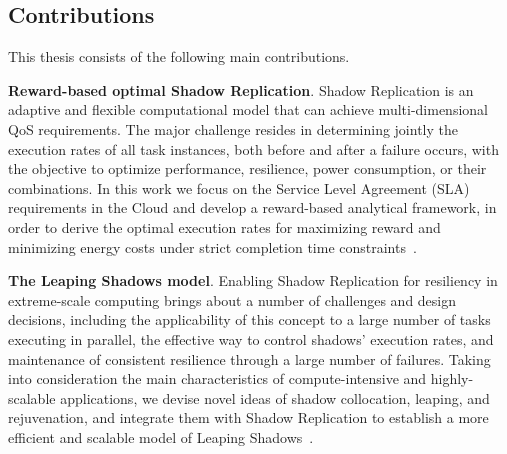 \subsection{Contributions}
This thesis consists of the following main contributions.

\textbf{Reward-based optimal Shadow Replication}.
Shadow Replication is an adaptive and flexible computational model that can achieve multi-dimensional QoS requirements. 
The major challenge resides in determining jointly the execution rates of all task instances, 
both before and after a failure occurs, with the objective to optimize performance, resilience, power consumption, or their combinations.
In this work we focus on the Service Level Agreement (SLA) requirements in the Cloud and develop a reward-based analytical framework, in order to derive the optimal execution rates for maximizing reward and minimizing energy 
costs under strict completion time constraints~\cite{cui_2014_closer,cui_en7085151}. 


\textbf{The Leaping Shadows model}.
Enabling Shadow Replication for resiliency in extreme-scale computing brings about a number of challenges and design decisions, including the applicability of this concept to a large number of tasks executing in parallel, 
the effective way to control shadows' execution rates, and maintenance of consistent resilience through a large number of failures. Taking into consideration the main characteristics of compute-intensive and 
highly-scalable applications, 
we devise novel ideas of shadow collocation, leaping, and rejuvenation, and integrate them with Shadow Replication to establish a more efficient and scalable model of Leaping Shadows~\cite{cui_2016_scalcom}.

